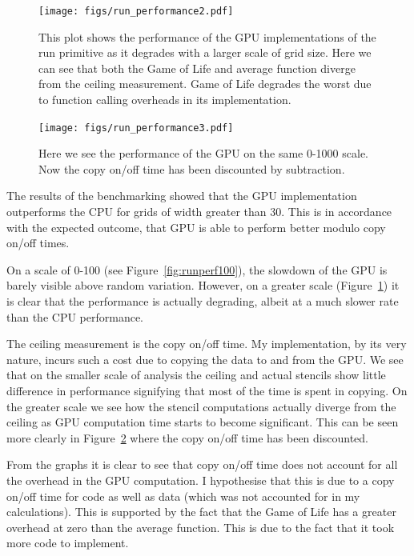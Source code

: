 \documentclass[12pt,a4paper,oneside]{scrbook}
\begin{document}
\begin{figure}[h]
  \texttt{[image: figs/run\_performance2.pdf]}
  \caption{This plot shows the performance of the GPU implementations of the run
    primitive as it degrades with a larger scale of grid size. Here we can see
    that both the Game of Life and average function diverge from the ceiling
    measurement. Game of Life degrades the worst due to function calling
    overheads in its implementation.}
  \label{fig:runperf1000}
\end{figure}

\begin{figure}[h]
  \texttt{[image: figs/run\_performance3.pdf]}
  \caption{Here we see the performance of the GPU on the same 0-1000 scale. Now
    the copy on/off time has been discounted by subtraction.}
  \label{fig:runperf1000dis}
\end{figure}

The results of the benchmarking showed that the GPU implementation outperforms
the CPU for grids of width greater than 30. This is in accordance with the
expected outcome, that GPU is able to perform better modulo copy on/off times.

On a scale of 0-100 (see Figure~\ref{fig:runperf100}), the slowdown of the GPU
is barely visible above random variation. However, on a greater scale
(Figure~\ref{fig:runperf1000}) it is clear that the performance is actually
degrading, albeit at a much slower rate than the CPU performance.

The ceiling measurement is the copy on/off time. My implementation, by its very
nature, incurs such a cost due to copying the data to and from the GPU. We see
that on the smaller scale of analysis the ceiling and actual stencils show
little difference in performance signifying that most of the time is spent in
copying. On the greater scale we see how the stencil computations actually
diverge from the ceiling as GPU computation time starts to become
significant. This can be seen more clearly in Figure~\ref{fig:runperf1000dis}
where the copy on/off time has been discounted.

From the graphs it is clear to see that copy on/off time does not account for
all the overhead in the GPU computation. I hypothesise that this is due to a
copy on/off time for code as well as data (which was not accounted for in my
calculations). This is supported by the fact that the Game of Life has a greater
overhead at zero than the average function. This is due to the fact that it took
more code to implement.
\end{document}
